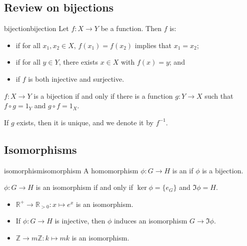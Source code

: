 \documentclass[12pt,letterpaper]{report}
\begin{document}
\pagebreak
\subsection{Review on bijections}

\begin{defn}{bijection}{bijection}
  Let $f \colon X \to Y$ be a function.
  Then $f$ is:
  \begin{itemize}
    \item {} if for all $x_1, x_2 \in X$, $f(x_1) = f(x_2)$ implies that $x_1 = x_2$;
    \item {} if for all $y \in Y$, there exists $x \in X$ with $f(x) = y$; and
    \item {} if $f$ is both injective and surjective.
  \end{itemize}
\end{defn}

\begin{prop}{}{}
  $f \colon X \to Y$ is a bijection if and only if there is a function $g \colon Y \to X$ such that
  $f \circ g = 1_Y$ and $g \circ f = 1_X$.
\end{prop}

If $g$ exists, then it is unique, and we denote it by $f^{-1}$.

\pagebreak
\subsection{Isomorphisms}

\begin{defn}{isomorphism}{isomorphism}
  A homomorphism $\phi \colon G \to H$ is an  if $\phi$ is a bijection.
\end{defn}

\begin{lem}{}{}
  $\phi \colon G \to H$ is an isomorphism if and only if $\ker \phi = \{e_G\}$ and $\Im \phi = H$.
\end{lem}

\begin{ex}
  \begin{itemize}
    \item $\mathbb{R}^+ \to \mathbb{R}_{> 0} : x \mapsto e^x$ is an isomorphism.
    \item If $\phi \colon G \to H$ is injective, then $\phi$ induces an isomorphism $G \to \Im\phi$.
    \item $\mathbb{Z} \to m\mathbb{Z} : k \mapsto mk$ is an isomorphism.
  \end{itemize}
\end{ex}
\end{document}
